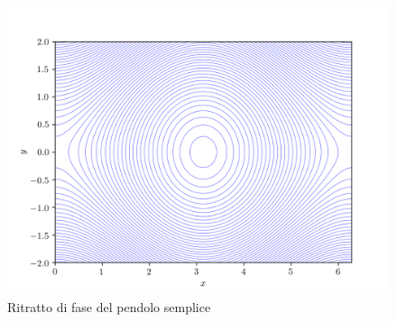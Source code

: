 \begin{example}
	\iffigureon
	\begin{figure}
		\centering
		\includegraphics{img/standard-map/fase-pendolo}
		\caption{Ritratto di fase del pendolo semplice}
		\label{fig:pendolo-fase}
	\end{figure}
	

\end{example}
